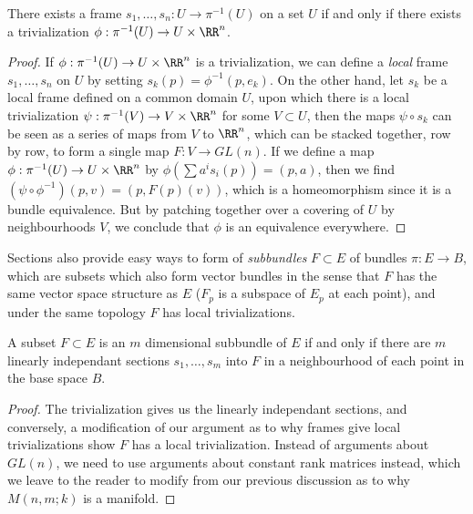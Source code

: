 \begin{theorem}
    There exists a frame $s_1, \dots, s_n: U \to \pi^{-1}(U)$ on a set $U$ if and only if there exists a trivialization $\phi: \pi^{-1}(U) \to U \times \RR^n$.
\end{theorem}
\begin{proof}
    If $\phi: \pi^{-1}(U) \to U \times \RR^n$ is a trivialization, we can define a {\it local} frame $s_1, \dots, s_n$ on $U$ by setting $s_k(p) = \phi^{-1}(p,e_k)$. On the other hand, let $s_k$ be a local frame defined on a common domain $U$, upon which there is a local trivialization $\psi: \pi^{-1}(V) \to V \times \RR^n$ for some $V \subset U$, then the maps $\psi \circ s_k$ can be seen as a series of maps from $V$ to $\RR^n$, which can be stacked together, row by row, to form a single map $F: V \to GL(n)$. If we define a map $\phi: \pi^{-1}(U) \to U \times \RR^n$ by $\phi(\sum a^i s_i(p)) = (p,a)$, then we find $(\psi \circ \phi^{-1})(p,v) = (p,F(p)(v))$, which is a homeomorphism since it is a bundle equivalence. But by patching together over a covering of $U$ by neighbourhoods $V$, we conclude that $\phi$ is an equivalence everywhere.
\end{proof}

Sections also provide easy ways to form of \emph{subbundles} $F \subset E$ of bundles $\pi: E \to B$, which are subsets which also form vector bundles in the sense that $F$ has the same vector space structure as $E$ ($F_p$ is a subspace of $E_p$ at each point), and under the same topology $F$ has local trivializations.

\begin{theorem}
    A subset $F \subset E$ is an $m$ dimensional subbundle of $E$ if and only if there are $m$ linearly independant sections $s_1, \dots, s_m$ into $F$ in a neighbourhood of each point in the base space $B$.
\end{theorem}
\begin{proof}
    The trivialization gives us the linearly independant sections, and conversely, a modification of our argument as to why frames give local trivializations show $F$ has a local trivialization. Instead of arguments about $GL(n)$, we need to use arguments about constant rank matrices instead, which we leave to the reader to modify from our previous discussion as to why $M(n,m;k)$ is a manifold.
\end{proof}


